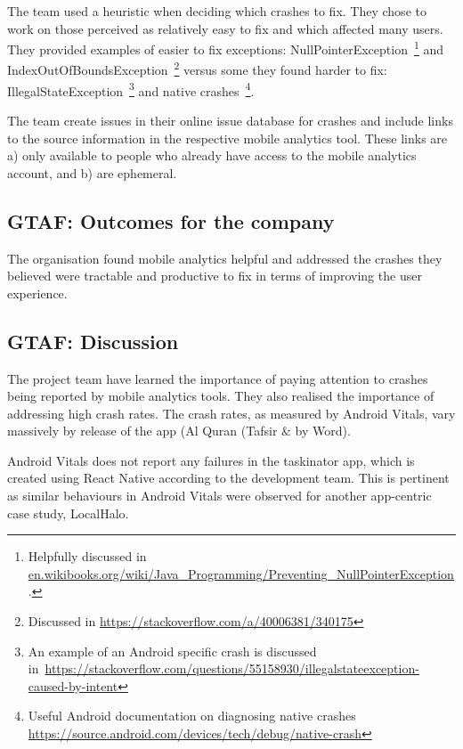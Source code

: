 The team used a heuristic when deciding which crashes to fix. They chose to work on those perceived as relatively easy to fix and which affected many users. They provided examples of easier to fix exceptions: NullPointerException~\footnote{Helpfully discussed in \href{https://en.wikibooks.org/wiki/Java\_Programming/Preventing\_NullPointerException}{en.wikibooks.org/wiki/Java\_Programming/Preventing\_NullPointerException}.} and IndexOutOfBoundsException~\footnote{Discussed in \url{https://stackoverflow.com/a/40006381/340175}} versus some they found harder to fix: IllegalStateException~\footnote{An example of an Android specific crash is discussed in~\url{https://stackoverflow.com/questions/55158930/illegalstateexception-caused-by-intent}} and native crashes~\footnote{Useful Android documentation on diagnosing native crashes \url{https://source.android.com/devices/tech/debug/native-crash}}.

The team create issues in their online issue database for crashes and include links to the source information in the respective mobile analytics tool. These links are a) only available to people who already have access to the mobile analytics account, and b) are ephemeral.

\subsection{GTAF: Outcomes for the company}
The organisation found mobile analytics helpful and addressed the crashes they believed were tractable and productive to fix in terms of improving the user experience.

\subsection{GTAF: Discussion}
The project team have learned the importance of paying attention to crashes being reported by mobile analytics tools. They also realised the importance of addressing high crash rates. The crash rates, as measured by Android Vitals, vary massively by release of the app (Al Quran (Tafsir \& by Word). 

Android Vitals does not report any failures in the taskinator app, which is created using React Native according to the development team. This is pertinent as similar behaviours in Android Vitals were observed for another app-centric case study, LocalHalo.  

